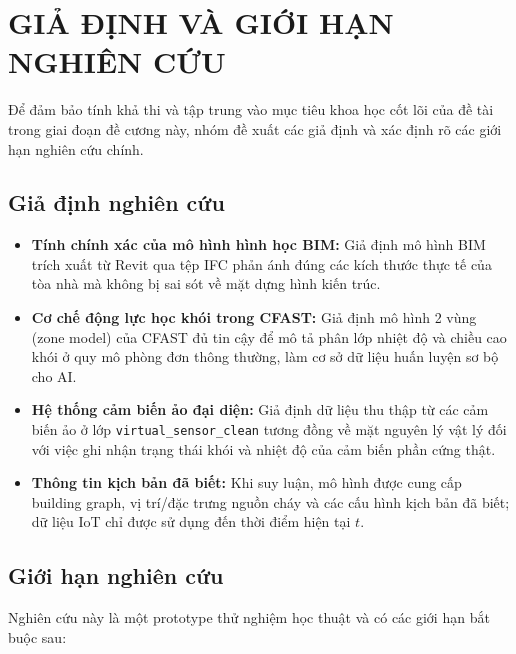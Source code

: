 
\chapter{GIẢ ĐỊNH VÀ GIỚI HẠN NGHIÊN CỨU}
\label{chap:assumptions}

Để đảm bảo tính khả thi và tập trung vào mục tiêu khoa học cốt lõi của đề tài trong giai đoạn đề cương này, nhóm đề xuất các giả định và xác định rõ các giới hạn nghiên cứu chính.

\section{Giả định nghiên cứu}
\label{sec:giadinh}

\begin{itemize}
  \item \textbf{Tính chính xác của mô hình hình học BIM:} Giả định mô hình BIM trích xuất từ Revit qua tệp IFC phản ánh đúng các kích thước thực tế của tòa nhà mà không bị sai sót về mặt dựng hình kiến trúc.
  \item \textbf{Cơ chế động lực học khói trong CFAST:} Giả định mô hình 2 vùng (zone model) của CFAST đủ tin cậy để mô tả phân lớp nhiệt độ và chiều cao khói ở quy mô phòng đơn thông thường, làm cơ sở dữ liệu huấn luyện sơ bộ cho AI.
  \item \textbf{Hệ thống cảm biến ảo đại diện:} Giả định dữ liệu thu thập từ các cảm biến ảo ở lớp \texttt{virtual\_sensor\_clean} tương đồng về mặt nguyên lý vật lý đối với việc ghi nhận trạng thái khói và nhiệt độ của cảm biến phần cứng thật.
  \item \textbf{Thông tin kịch bản đã biết:} Khi suy luận, mô hình được cung cấp building graph, vị trí/đặc trưng nguồn cháy và các cấu hình kịch bản đã biết; dữ liệu IoT chỉ được sử dụng đến thời điểm hiện tại $t$.
\end{itemize}

\section{Giới hạn nghiên cứu}
\label{sec:gioihan}

Nghiên cứu này là một prototype thử nghiệm học thuật và có các giới hạn bắt buộc sau:

